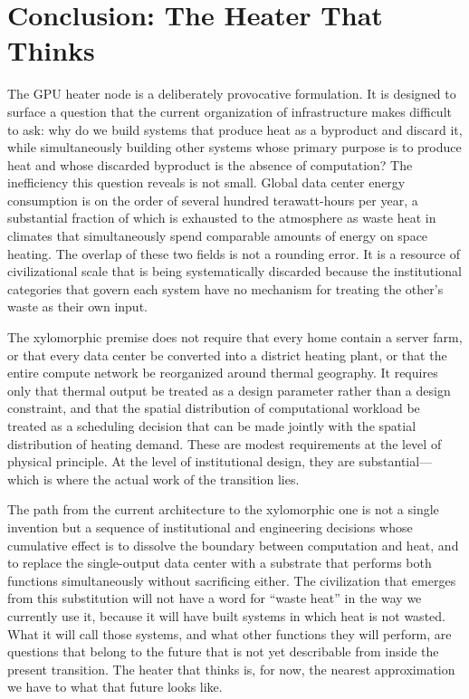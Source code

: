 \documentclass[12pt, oneside]{article}
\begin{document}
\section{Conclusion: The Heater That Thinks}

The GPU heater node is a deliberately provocative formulation. It is designed to surface a question that the current organization of infrastructure makes difficult to ask: why do we build systems that produce heat as a byproduct and discard it, while simultaneously building other systems whose primary purpose is to produce heat and whose discarded byproduct is the absence of computation? The inefficiency this question reveals is not small. Global data center energy consumption is on the order of several hundred terawatt-hours per year, a substantial fraction of which is exhausted to the atmosphere as waste heat in climates that simultaneously spend comparable amounts of energy on space heating. The overlap of these two fields is not a rounding error. It is a resource of civilizational scale that is being systematically discarded because the institutional categories that govern each system have no mechanism for treating the other's waste as their own input.

The xylomorphic premise does not require that every home contain a server farm, or that every data center be converted into a district heating plant, or that the entire compute network be reorganized around thermal geography. It requires only that thermal output be treated as a design parameter rather than a design constraint, and that the spatial distribution of computational workload be treated as a scheduling decision that can be made jointly with the spatial distribution of heating demand. These are modest requirements at the level of physical principle. At the level of institutional design, they are substantial---which is where the actual work of the transition lies.

The path from the current architecture to the xylomorphic one is not a single invention but a sequence of institutional and engineering decisions whose cumulative effect is to dissolve the boundary between computation and heat, and to replace the single-output data center with a substrate that performs both functions simultaneously without sacrificing either. The civilization that emerges from this substitution will not have a word for \enquote{waste heat} in the way we currently use it, because it will have built systems in which heat is not wasted. What it will call those systems, and what other functions they will perform, are questions that belong to the future that is not yet describable from inside the present transition. The heater that thinks is, for now, the nearest approximation we have to what that future looks like.
\end{document}
